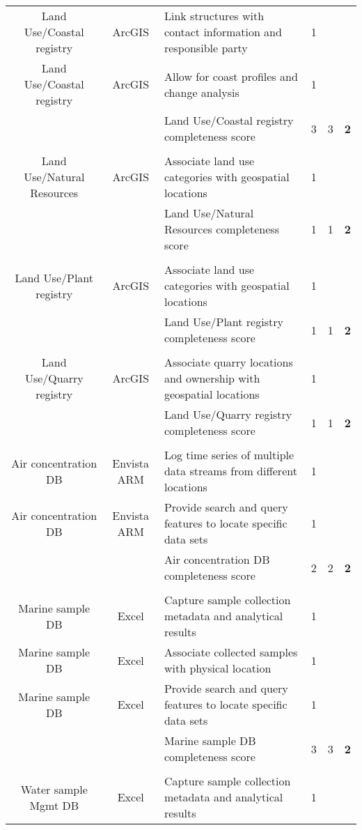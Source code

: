\begin{table}[H]
{\begin{tabular}{@{}cclccc@{}}
Land Use/Coastal registry & ArcGIS & Link structures with contact information and responsible party & 1 &  &  \\
Land Use/Coastal registry & ArcGIS & Allow for coast profiles and change analysis & 1 &  &  \\
 &  & Land Use/Coastal registry completeness score & 3 & 3 & \textbf{2} \\
 &  &  &  &  &  \\
Land Use/Natural Resources & ArcGIS & Associate land use categories with geospatial locations & 1 &  &  \\
 &  & Land Use/Natural Resources completeness score & 1 & 1 & \textbf{2} \\
 &  &  &  &  &  \\
Land Use/Plant registry & ArcGIS & Associate land use categories with geospatial locations & 1 &  &  \\
 &  & Land Use/Plant registry completeness score & 1 & 1 & \textbf{2} \\
 &  &  &  &  &  \\
Land Use/Quarry registry & ArcGIS & Associate quarry locations and ownership with geospatial locations & 1 &  &  \\
 &  & Land Use/Quarry registry completeness score & 1 & 1 & \textbf{2} \\
 &  &  &  &  &  \\
Air concentration DB & Envista ARM & Log time series of multiple data streams from different locations & 1 &  &  \\
Air concentration DB & Envista ARM & Provide search and query features to locate specific data sets & 1 &  &  \\
 &  & Air concentration DB completeness score & 2 & 2 & \textbf{2} \\
 &  &  &  &  &  \\
Marine sample DB & Excel & Capture sample collection metadata and analytical results & 1 &  &  \\
Marine sample DB & Excel & Associate collected samples with physical location & 1 &  &  \\
Marine sample DB & Excel & Provide search and query features to locate specific data sets & 1 &  &  \\
 &  & Marine sample DB completeness score & 3 & 3 & \textbf{2} \\
 &  &  &  &  &  \\
Water sample Mgmt DB & Excel & Capture sample collection metadata and analytical results & 1 &  &  \\

\end{tabular}}
\end{table}
